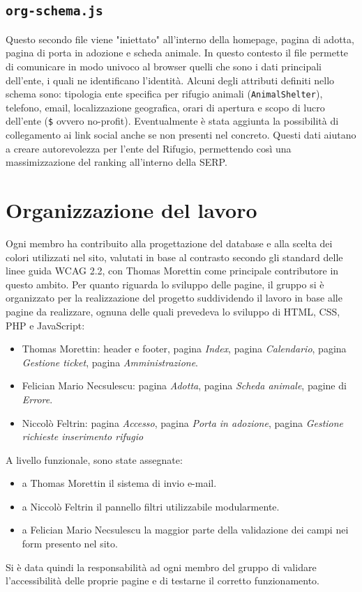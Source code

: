\documentclass[a4paper,10pt]{article}
\begin{document}
	\subsection{\texttt{org-schema.js}}
	Questo secondo file viene "iniettato" all'interno della homepage, pagina di adotta, pagina di porta in adozione e scheda animale. In questo contesto il file permette di comunicare in modo univoco al browser quelli che sono i dati principali dell'ente, i quali ne identificano l'identità. Alcuni degli attributi definiti nello schema sono: tipologia ente specifica per rifugio animali (\texttt{AnimalShelter}), telefono, email, localizzazione geografica, orari di apertura e scopo di lucro dell'ente (\texttt{\$} ovvero no-profit). Eventualmente è stata aggiunta la possibilità di collegamento ai link social anche se non presenti nel concreto. Questi dati aiutano a creare autorevolezza per l'ente del Rifugio, permettendo così una massimizzazione del ranking all'interno della SERP.
	\section{Organizzazione del lavoro}
	Ogni membro ha contribuito alla progettazione del database e alla scelta dei colori utilizzati nel sito, valutati in base al contrasto secondo gli standard delle linee guida WCAG 2.2, con Thomas Morettin come principale contributore in questo ambito.
	Per quanto riguarda lo sviluppo delle pagine, il gruppo si è organizzato per la realizzazione del progetto suddividendo il lavoro in base alle pagine da realizzare, ognuna delle quali prevedeva lo sviluppo di HTML, CSS, PHP e JavaScript:
	\begin{itemize}
		\item Thomas Morettin: header e footer, pagina \emph{Index}, pagina \emph{Calendario}, pagina \emph{Gestione ticket}, pagina \emph{Amministrazione}.
		\item Felician Mario Necsulescu: pagina \emph{Adotta}, pagina \emph{Scheda animale}, pagine di \emph{Errore}.
		\item Niccolò Feltrin: pagina \emph{Accesso}, pagina \emph{Porta in adozione}, pagina \emph{Gestione richieste inserimento rifugio} 
	\end{itemize}
	A livello funzionale, sono state assegnate:
	\begin{itemize}
		\item a Thomas Morettin il sistema di invio e-mail.
		\item a Niccolò Feltrin il pannello filtri utilizzabile modularmente.
		\item a Felician Mario Necsulescu la maggior parte della validazione dei campi nei form presento nel sito.
	\end{itemize}
	Si è data quindi la responsabilità ad ogni membro del gruppo di validare l'accessibilità delle proprie pagine e di testarne il corretto funzionamento.
\end{document}
